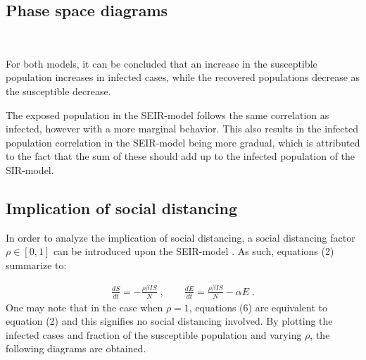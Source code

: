 \documentclass[12pt]{article}
\begin{document}
\subsection{Phase space diagrams}
\begin{figure*}[ht!]
\begin{center}
   \\
   \caption{\label{workflow} (a) SIR - $R_0 = 4$ (b) SEIR - $R_0 = 4$}
\end{center}
\end{figure*}
\noindent For both models, it can be concluded that an
increase in the susceptible population increases 
in infected cases, while the recovered populations 
decrease as the susceptible decrease. 

The exposed population in the SEIR-model follows the same 
correlation as infected, however with a more marginal behavior. 
This also results in the infected population correlation in 
the SEIR-model being more gradual, which is attributed 
to the fact that the sum of these should add up to
the infected population of the SIR-model.

\newpage 
\subsection{Implication of social distancing}
In order to analyze the implication of social distancing, 
a social distancing factor $\rho \in [0,1]$ 
can be introduced upon the SEIR-model \cite{gill}. 
As such, equations (2) summarize to:

\begin{gather}
\frac{dS}{dt} = - \frac{\rho \beta I S}{N} \;, \qquad
\frac{dE}{dt} = \frac{\rho \beta I S}{N}- \alpha E \;.
\end{gather}
One may note that in the case when $\rho = 1$, equations (6) 
are equivalent to equation (2) and this signifies no social 
distancing involved. By plotting the infected cases and 
fraction of  the susceptible population and 
varying $\rho$, the following diagrams are obtained.

\begin{figure*}[ht!]
\begin{center}
   \\
   \caption{\label{workflow} (a) Infected cases (b) Susceptibility fraction}
\end{center}
\end{figure*}
\end{document}
